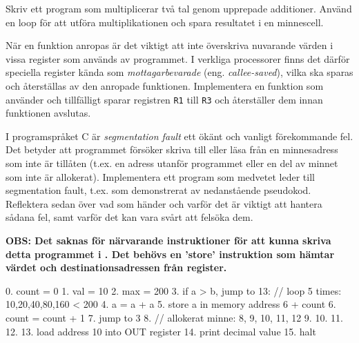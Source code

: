 \begin{Extrauppgifter}
\begin{enumerate}
    \end{enumerate}

    \item Skriv ett program som multiplicerar två tal genom upprepade additioner. Använd en loop för att utföra multiplikationen och spara resultatet i en minnescell.

    \item När en funktion anropas är det viktigt att inte överskriva nuvarande värden i vissa register som används av programmet. I verkliga processorer finns det därför speciella register kända som \emph{mottagarbevarade} (eng. \emph{callee-saved}), vilka ska sparas och återställas av den anropade funktionen. Implementera en funktion som använder och tillfälligt sparar registren \texttt{R1} till \texttt{R3} och återställer dem innan funktionen avslutas.


    \item I programspråket C är \emph{segmentation fault} ett ökänt och vanligt förekommande fel. Det betyder att programmet försöker skriva till eller läsa från en minnesadress som inte är tillåten (t.ex. en adress utanför programmet eller en del av minnet som inte är allokerat).    
    Implementera ett program som medvetet leder till segmentation fault, t.ex. som demonstrerat av nedanstående pseudokod. Reflektera sedan över vad som händer och varför det är viktigt att hantera sådana fel, samt varför det kan vara svårt att felsöka dem.

    \textbf{OBS: Det saknas för närvarande instruktioner för att kunna skriva detta programmet i \progname{}. Det behövs en 'store' instruktion som hämtar värdet och destinationsadressen från register.}
    \begin{Code}
        0. count = 0
        1. val = 10
        2. max = 200
        3. if a > b, jump to 13:  // loop 5 times: 10,20,40,80,160 < 200
        4.     a = a + a
        5.     store a in memory address 6 + count
        6.     count = count + 1
        7.     jump to 3
        8. // allokerat minne: 8, 9, 10, 11, 12
        9.
       10.
       11.
       12.
       13. load address 10 into OUT register
       14. print decimal value
       15. halt
    \end{Code}
    

\end{Extrauppgifter}

